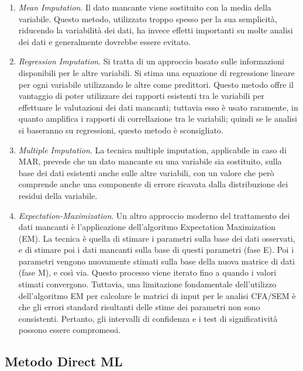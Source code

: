 \documentclass[
  11pt,
]{krantz}
\providecommand{\tightlist}{%
  \setlength{\itemsep}{0pt}\setlength{\parskip}{0pt}}
\theoremstyle{definition}
\theoremstyle{definition}
\theoremstyle{definition}
\theoremstyle{definition}
\theoremstyle{remark}
\begin{document}
\begin{enumerate}
\def\labelenumi{\arabic{enumi}.}
\tightlist
\item
  \emph{Mean Imputation}. Il dato mancante viene sostituito con la media della variabile. Questo metodo, utilizzato troppo spesso per la sua semplicità, riducendo la variabilità dei dati, ha invece effetti importanti su molte analisi dei dati e generalmente dovrebbe essere evitato.
\item
  \emph{Regression Imputation}. Si tratta di un approccio basato sulle informazioni disponibili per le altre variabili. Si stima una equazione di regressione lineare per ogni variabile utilizzando le altre come predittori. Questo metodo offre il vantaggio di poter utilizzare dei rapporti esistenti tra le variabili per effettuare le valutazioni dei dati mancanti; tuttavia esso è usato raramente, in quanto amplifica i rapporti di correllazione tra le variabili; quindi se le analisi si baseranno su regressioni, questo metodo è sconsigliato.
\item
  \emph{Multiple Imputation}. La tecnica multiple imputation, applicabile in caso di MAR, prevede che un dato mancante su una variabile sia sostituito, sulla base dei dati esistenti anche sulle altre variabili, con un valore che però comprende anche una componente di errore ricavata dalla distribuzione dei residui della variabile.
\item
  \emph{Expectation-Maximization}. Un altro approccio moderno del trattamento dei dati mancanti è l'applicazione dell'algoritmo Expectation Maximization (EM). La tecnica è quella di stimare i parametri sulla base dei dati osservati, e di stimare poi i dati mancanti sulla base di questi parametri (fase E). Poi i parametri vengono nuovamente stimati sulla base della nuova matrice di dati (fase M), e così via. Questo processo viene iterato fino a quando i valori stimati convergono. Tuttavia, una limitazione fondamentale dell'utilizzo dell'algoritmo EM per calcolare le matrici di input per le analisi CFA/SEM è che gli errori standard risultanti delle stime dei parametri non sono consistenti. Pertanto, gli intervalli di confidenza e i test di significatività possono essere compromessi.
\end{enumerate}

\hypertarget{metodo-direct-ml}{%
\subsection{Metodo Direct ML}\label{metodo-direct-ml}}
\end{document}
